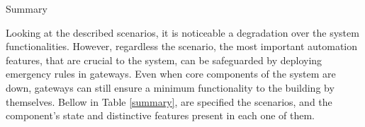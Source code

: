 \begin{Paragraph}{Summary}

	
Looking at the described scenarios, it is noticeable a degradation over the system functionalities. However, regardless the scenario, the most important automation features, that are crucial to the system, can be safeguarded by deploying emergency rules in gateways. Even when core components of the system are down, gateways can still ensure a minimum functionality to the building by themselves. Bellow in Table \ref{summary}, are specified the scenarios, and the component's state and distinctive features present in each one of them.

	
\begin{table}[H]
	\centering
	
\end{table}
\end{Paragraph}
